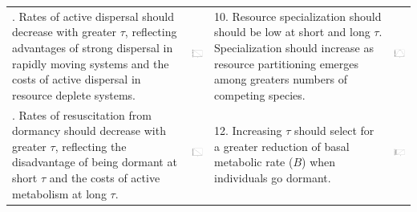 \documentclass{article}
\begin{document}
\begin{table}
\begin{tabularx}{\textwidth}{m{5.6cm} m{3.4cm} m{5.6cm} m{3.4cm}}
\addlinespace
9. Rates of active dispersal should decrease with greater $\tau$, reflecting advantages of strong dispersal in rapidly moving systems and the costs of active dispersal in resource deplete systems.
&
\begin{minipage}{.3\textwidth}
\includegraphics[width=30mm, height=25mm]{predictions/Dispersal}
\end{minipage}
&
10. Resource specialization should should be low at short and long $\tau$. Specialization should increase as resource partitioning emerges among greaters numbers of competing species.
&
\begin{minipage}{.3\textwidth}
\includegraphics[width=30mm, height=25mm]{predictions/Spec}
\end{minipage} \\
 
\addlinespace
11. Rates of resuscitation from dormancy should decrease with greater $\tau$, reflecting the disadvantage of being dormant at short $\tau$ and the costs of active metabolism at long $\tau$.
&
\begin{minipage}{.3\textwidth}
\includegraphics[width=30mm, height=25mm]{predictions/Resus}
\end{minipage}
&
12. Increasing $\tau$ should select for a greater reduction of basal metabolic rate ($B$) when individuals go dormant.
&
\begin{minipage}{.3\textwidth}
\includegraphics[width=30mm, height=25mm]{predictions/ReducB}
\end{minipage} \\
 

\end{tabularx}
\end{table}
\end{document}

